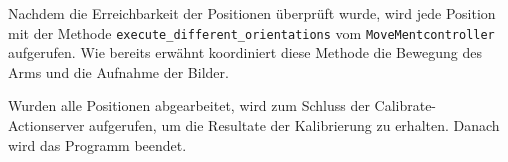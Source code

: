 Nachdem die Erreichbarkeit der Positionen überprüft wurde, wird jede Position mit der Methode \texttt{execute\_different\_orientations} vom \texttt{MoveMentcontroller} aufgerufen. Wie bereits erwähnt koordiniert diese Methode die Bewegung des Arms und die Aufnahme der Bilder.

Wurden alle Positionen abgearbeitet, wird zum Schluss der Calibrate-Actionserver aufgerufen, um die Resultate der Kalibrierung zu erhalten. Danach wird das Programm beendet. 
